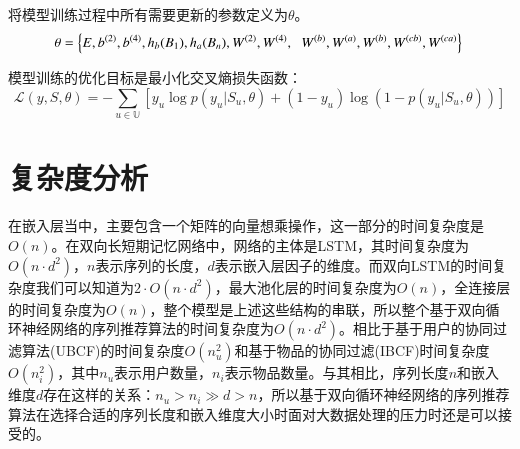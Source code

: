 将模型训练过程中所有需要更新的参数定义为$\theta $。
\begin{equation}
\theta=  \left \{ E,b^{(2)},b^{(4)},h_{b}(B_{1}),h_{a}(B_{n}),W^{(2)}, W^{(4)},\right.\\
\left.W^{(b)},W^{(a)},W^{(b)},W^{(cb)},W^{(ca)} \right \} \\
\end{equation}

模型训练的优化目标是最小化交叉熵损失函数：
\begin{equation}
\mathcal{L}(y,S,\theta )=-\sum_{u\in \mathbb{U}}[y_{u}\log p(y_{u}|S_{u},\theta)+(1-y_{u})\log (1-p(y_{u}|S_{u},\theta ))]
\end{equation}


\section{复杂度分析}
在嵌入层当中，主要包含一个矩阵的向量想乘操作，这一部分的时间复杂度是$O(n)$。在双向长短期记忆网络中，网络的主体是LSTM，其时间复杂度为$O(n\cdot d^{2})$，$n$表示序列的长度，$d$表示嵌入层因子的维度。而双向LSTM的时间复杂度我们可以知道为$2\cdot O(n\cdot d^{2})$，最大池化层的时间复杂度为$O(n)$，全连接层的时间复杂度为$O(n)$，整个模型是上述这些结构的串联，所以整个基于双向循环神经网络的序列推荐算法的时间复杂度为$O(n\cdot d^{2})$。相比于基于用户的协同过滤算法(UBCF)的时间复杂度$O(n_{u}^{2})$和基于物品的协同过滤(IBCF)时间复杂度$O(n_{i}^{2})$，其中$n_{u}$表示用户数量，$n_{i}$表示物品数量。与其相比，序列长度$n$和嵌入维度$d$存在这样的关系：$n_{u}> n_{i}\gg d> n$，所以基于双向循环神经网络的序列推荐算法在选择合适的序列长度和嵌入维度大小时面对大数据处理的压力时还是可以接受的。





